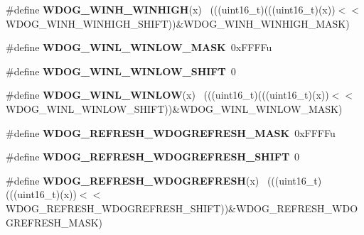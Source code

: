 \begin{DoxyCompactItemize}
\item 
\hypertarget{group___w_d_o_g___register___masks_gaf361b5b26d7ba7d6aa8491bdb494f4ac}{}\#define {\bfseries W\+D\+O\+G\+\_\+\+W\+I\+N\+H\+\_\+\+W\+I\+N\+H\+I\+G\+H}(x)                                      ~(((uint16\+\_\+t)(((uint16\+\_\+t)(x))$<$$<$W\+D\+O\+G\+\_\+\+W\+I\+N\+H\+\_\+\+W\+I\+N\+H\+I\+G\+H\+\_\+\+S\+H\+I\+F\+T))\&W\+D\+O\+G\+\_\+\+W\+I\+N\+H\+\_\+\+W\+I\+N\+H\+I\+G\+H\+\_\+\+M\+A\+S\+K)\label{group___w_d_o_g___register___masks_gaf361b5b26d7ba7d6aa8491bdb494f4ac}

\item 
\hypertarget{group___w_d_o_g___register___masks_gadc36bfdccd5e9c14d063a5b36b6a3f6a}{}\#define {\bfseries W\+D\+O\+G\+\_\+\+W\+I\+N\+L\+\_\+\+W\+I\+N\+L\+O\+W\+\_\+\+M\+A\+S\+K}~0x\+F\+F\+F\+Fu\label{group___w_d_o_g___register___masks_gadc36bfdccd5e9c14d063a5b36b6a3f6a}

\item 
\hypertarget{group___w_d_o_g___register___masks_ga7f2baf848e4bfe9b0143d073467d1c1a}{}\#define {\bfseries W\+D\+O\+G\+\_\+\+W\+I\+N\+L\+\_\+\+W\+I\+N\+L\+O\+W\+\_\+\+S\+H\+I\+F\+T}~0\label{group___w_d_o_g___register___masks_ga7f2baf848e4bfe9b0143d073467d1c1a}

\item 
\hypertarget{group___w_d_o_g___register___masks_ga7f530a06e58e70f3efd6955dfab8cec6}{}\#define {\bfseries W\+D\+O\+G\+\_\+\+W\+I\+N\+L\+\_\+\+W\+I\+N\+L\+O\+W}(x)                                        ~(((uint16\+\_\+t)(((uint16\+\_\+t)(x))$<$$<$W\+D\+O\+G\+\_\+\+W\+I\+N\+L\+\_\+\+W\+I\+N\+L\+O\+W\+\_\+\+S\+H\+I\+F\+T))\&W\+D\+O\+G\+\_\+\+W\+I\+N\+L\+\_\+\+W\+I\+N\+L\+O\+W\+\_\+\+M\+A\+S\+K)\label{group___w_d_o_g___register___masks_ga7f530a06e58e70f3efd6955dfab8cec6}

\item 
\hypertarget{group___w_d_o_g___register___masks_ga59e560838a4c519b514c0def0d6034fa}{}\#define {\bfseries W\+D\+O\+G\+\_\+\+R\+E\+F\+R\+E\+S\+H\+\_\+\+W\+D\+O\+G\+R\+E\+F\+R\+E\+S\+H\+\_\+\+M\+A\+S\+K}~0x\+F\+F\+F\+Fu\label{group___w_d_o_g___register___masks_ga59e560838a4c519b514c0def0d6034fa}

\item 
\hypertarget{group___w_d_o_g___register___masks_ga526acc27150ff67f1f026bdcc1bb364c}{}\#define {\bfseries W\+D\+O\+G\+\_\+\+R\+E\+F\+R\+E\+S\+H\+\_\+\+W\+D\+O\+G\+R\+E\+F\+R\+E\+S\+H\+\_\+\+S\+H\+I\+F\+T}~0\label{group___w_d_o_g___register___masks_ga526acc27150ff67f1f026bdcc1bb364c}

\item 
\hypertarget{group___w_d_o_g___register___masks_gac8bddfffd653d08494c2379dd56190fd}{}\#define {\bfseries W\+D\+O\+G\+\_\+\+R\+E\+F\+R\+E\+S\+H\+\_\+\+W\+D\+O\+G\+R\+E\+F\+R\+E\+S\+H}(x)                        ~(((uint16\+\_\+t)(((uint16\+\_\+t)(x))$<$$<$W\+D\+O\+G\+\_\+\+R\+E\+F\+R\+E\+S\+H\+\_\+\+W\+D\+O\+G\+R\+E\+F\+R\+E\+S\+H\+\_\+\+S\+H\+I\+F\+T))\&W\+D\+O\+G\+\_\+\+R\+E\+F\+R\+E\+S\+H\+\_\+\+W\+D\+O\+G\+R\+E\+F\+R\+E\+S\+H\+\_\+\+M\+A\+S\+K)\label{group___w_d_o_g___register___masks_gac8bddfffd653d08494c2379dd56190fd}


\end{DoxyCompactItemize}
